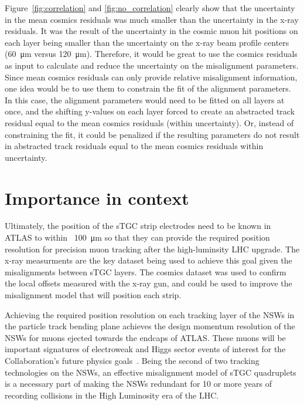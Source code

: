 Figure~\ref{fig:correlation} and \ref{fig:no_correlation} clearly show that the uncertainty in the mean cosmics residuals was much smaller than the uncertainty in the x-ray residuals. It was the result of the uncertainty in the cosmic muon hit positions on each layer being smaller than the uncertainty on the x-ray beam profile centers (\SI{60}{\micro\meter} versus \SI{120}{\micro\meter}). Therefore, it would be great to use the cosmics residuals as input to calculate and reduce the uncertainty on the misalignment parameters. Since mean cosmics residuals can only provide relative misalignment information, one idea would be to use them to constrain the fit of the alignment parameters. In this case, the alignment parameters would need to be fitted on all layers at once, and the shifting y-values on each layer forced to create an abstracted track residual equal to the mean cosmics residuals (within uncertainty). Or, instead of constraining the fit, it could be penalized if the resulting parameters do not result in abstracted track residuals equal to the mean cosmics residuals within uncertainty. 

\section{Importance in context}
\label{sec:importance}

Ultimately, the position of the sTGC strip electrodes need to be known in ATLAS to within ~\SI{100}{\micro\meter} so that they can provide the required position resolution for precision muon tracking after the high-luminsity LHC upgrade. The x-ray measurments are the key dataset being used to achieve this goal given the misalignments between sTGC layers. The cosmics dataset was used to confirm the local offsets measured with the x-ray gun, and could be used to improve the misalignment model that will position each strip.

Achieving the required position resolution on each tracking layer of the NSWs in the particle track bending plane achieves the design momentum resolution of the NSWs for muons ejected towards the endcaps of ATLAS. These muons will be important signatures of electroweak and Higgs sector events of interest for the Collaboration's future physics goals~\cite{nsw_tdr}. Being the second of two tracking technologies on the NSWs, an effective misalignment model of sTGC quadruplets is a necessary part of making the NSWs redundant for 10 or more years of recording collisions in the High Luminosity era of the LHC. 